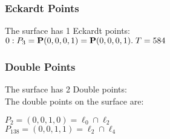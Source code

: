 \documentclass{article}
\newcommand{\bP}{{\bf P}}
\begin{document}
{\subsubsection*{Eckardt Points}
The surface has 1 Eckardt points:\\
$0 : P_{3}=\bP(0, 0, 0, 1) = \bP(0, 0, 0, 1).\; T= 584$\\
\subsubsection*{Double Points}
The surface has 2 Double points:\\
The double points on the surface are:\\
\begin{multicols}{2}
\noindent
$P_{2} = ( 0, 0, 1, 0 ) = \ell_{0} \cap \ell_{2} $\\
$P_{138} = ( 0, 0, 1, 1 ) = \ell_{2} \cap \ell_{4} $\\
\end{multicols}
}
\end{document}
